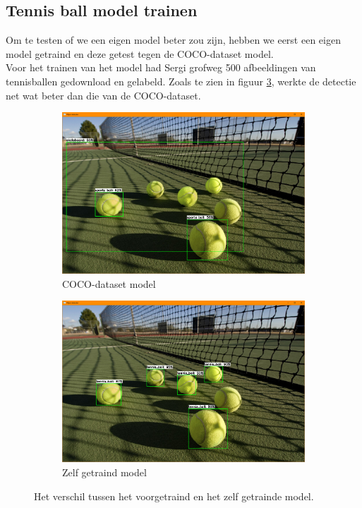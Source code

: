 \subsection{Tennis ball model trainen}
Om te testen of we een eigen model beter zou zijn, hebben we eerst een eigen model getraind en deze getest tegen de COCO-dataset \cite{COCO-dataset} model.\\

Voor het trainen van het model had Sergi grofweg 500 afbeeldingen van tennisballen gedownload en gelabeld. Zoals te zien in figuur \ref{fig:model-verschil}, werkte de detectie net wat beter dan die van de COCO-dataset.\\

\begin{figure}[H]
    \begin{subfigure}{0.5\textwidth}
        \includegraphics[width=0.9\linewidth]{img/coco_model_test.png} 
        \caption{COCO-dataset model}
        \label{fig:coco-model}
    \end{subfigure}
    \begin{subfigure}{0.5\textwidth}
        \includegraphics[width=0.9\linewidth]{img/custom_model_test.png}
        \caption{Zelf getraind model}
        \label{fig:custom-model}
    \end{subfigure}
    \caption{Het verschil tussen het voorgetraind en het zelf getrainde model.}
    \label{fig:model-verschil}
\end{figure}

